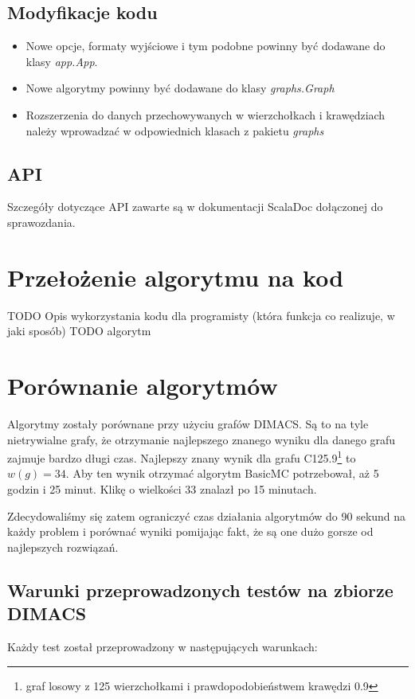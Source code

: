 \documentclass[12pt, a4paper]{article}
\begin{document}
\subsection{Modyfikacje kodu}
\begin{itemize}
\item Nowe opcje, formaty wyjściowe i tym podobne powinny być dodawane do klasy \emph{app.App}.
\item Nowe algorytmy powinny być dodawane do klasy \emph{graphs.Graph}
\item Rozszerzenia do danych przechowywanych w wierzchołkach i krawędziach należy wprowadzać w odpowiednich klasach z pakietu \emph{graphs}
\end{itemize}

\subsection{API}
Szczegóły dotyczące API zawarte są w dokumentacji ScalaDoc dołączonej do sprawozdania.


\section{Przełożenie algorytmu na kod}
TODO Opis wykorzystania kodu dla programisty (która funkcja co realizuje, w jaki sposób)
TODO algorytm

\section{Porównanie algorytmów}
Algorytmy zostały porównane przy użyciu grafów DIMACS\citep{dimacs}. Są to na tyle nietrywialne grafy, że otrzymanie najlepszego znanego wyniku dla danego grafu zajmuje bardzo długi czas. Najlepszy znany wynik dla grafu C125.9\footnote{graf losowy z 125 wierzchołkami i prawdopodobieństwem krawędzi 0.9}  to $w(g)=34$. Aby ten wynik otrzymać algorytm BasicMC potrzebował, aż 5 godzin i 25 minut. Klikę o wielkości 33 znalazł po 15 minutach.

Zdecydowaliśmy się zatem ograniczyć czas działania algorytmów do 90 sekund na każdy problem i porównać wyniki pomijając fakt, że są one dużo gorsze od najlepszych rozwiązań.

\subsection{Warunki przeprowadzonych testów na zbiorze DIMACS}
Każdy test został przeprowadzony w następujących warunkach:
\end{document}
